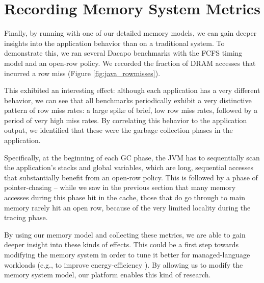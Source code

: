 \section{Recording Memory System Metrics}

Finally, by running with one of our detailed memory models, we can gain deeper
insights into the application behavior than on a traditional system. To
demonstrate this, we ran several Dacapo benchmarks with the FCFS timing model
and an open-row policy. We recorded the fraction of DRAM accesses that incurred
a row miss (Figure \ref{fig:java_rowmisses}).

This exhibited an interesting effect: although each application has a very
different behavior, we can see that all benchmarks periodically exhibit a very
distinctive pattern of row miss rates: a large spike of brief, low row miss
rates, followed by a period of very high miss rates. By correlating this
behavior to the application output, we identified that these were the garbage
collection phases in the application.

Specifically, at the beginning of each GC phase, the JVM has to sequentially
scan the application's stacks and global variables, which are long, sequential
accesses that substantially benefit from an open-row policy. This is followed
by a phase of pointer-chasing -- while we saw in the previous section that many
memory accesses during this phase hit in the cache, those that do go through to
main memory rarely hit an open row, because of the very limited locality during
the tracing phase.

By using our memory model and collecting these metrics, we are able to gain
deeper insight into these kinds of effects. This could be a first step towards
modifying the memory system in order to tune it better for managed-language
workloads (e.g., to improve energy-efficiency
\cite{Cao:2012:YYP:2337159.2337185}). By allowing us to modify the memory
system model, our platform enables this kind of research.
